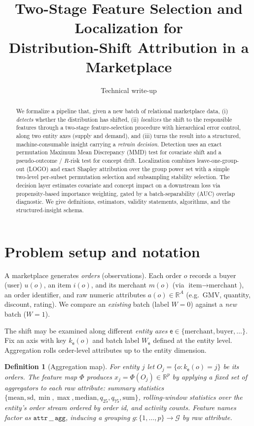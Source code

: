 \documentclass[11pt]{article}
\title{\textbf{Two-Stage Feature Selection and Localization for\\
Distribution-Shift Attribution in a Marketplace}}
\author{Technical write-up}
\date{}
\newtheorem{definition}{Definition}
\newcommand{\R}{\mathbb{R}}
\newcommand{\Gcal}{\mathcal{G}}
\begin{document}
\maketitle

\begin{abstract}
We formalize a pipeline that, given a new batch of relational marketplace data,
(i) \emph{detects} whether the distribution has shifted, (ii) \emph{localizes}
the shift to the responsible features through a two-stage feature-selection
procedure with hierarchical error control, along two entity axes (supply and
demand), and (iii) turns the result into a structured, machine-consumable
insight carrying a \emph{retrain decision}. Detection uses an exact
permutation Maximum Mean Discrepancy (MMD) test for covariate shift and a
pseudo-outcome / $R$-risk test for concept drift. Localization combines
leave-one-group-out (LOGO) and exact Shapley attribution over the group power
set with a simple two-level per-subset permutation selection and subsampling
stability selection. The decision layer estimates covariate and
concept impact on a downstream loss via propensity-based importance weighting,
gated by a batch-separability (AUC) overlap diagnostic. We give definitions,
estimators, validity statements, algorithms, and the structured-insight schema.
\end{abstract}

\tableofcontents

\section{Problem setup and notation}

A marketplace generates \emph{orders} (observations). Each order $o$ records a
buyer (user) $u(o)$, an item $i(o)$, and its merchant $m(o)$ (via
$\text{item}\to\text{merchant}$), an order identifier, and raw numeric
attributes $a(o) \in \R^{A}$ (e.g.\ GMV, quantity, discount, rating). We compare
an \emph{existing} batch (label $W=0$) against a \emph{new} batch ($W=1$).

The shift may be examined along different \emph{entity axes}
$\mathsf{e} \in \{\text{merchant}, \text{buyer}, \dots\}$. Fix an axis with key
$k_{\mathsf e}(o)$ and batch label $W_{\mathsf e}$ defined at the entity level.
Aggregation rolls order-level attributes up to the entity dimension.

\begin{definition}[Aggregation map]
For entity $j$ let $O_j=\{o : k_{\mathsf e}(o)=j\}$ be its orders. The feature map
$\Phi$ produces $x_j=\Phi(O_j)\in\R^{p}$ by applying a fixed set of aggregators
to each raw attribute: summary statistics
$\{\text{mean},\text{sd},\min,\max,\text{median},q_{25},q_{75},\text{sum}\}$,
rolling-window statistics over the entity's order stream ordered by order id, and
activity counts. Feature names factor as
$\texttt{attr}\,\texttt{\_\_}\,\texttt{agg}$, inducing a grouping
$g:\{1,\dots,p\}\to\Gcal$ by raw attribute.
\end{definition}
\end{document}
